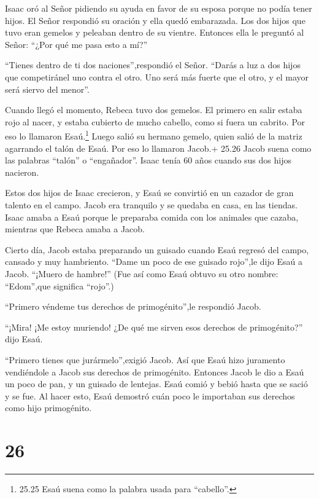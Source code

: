  Isaac oró al Señor pidiendo su ayuda en favor de su esposa
porque no podía tener hijos. El Señor respondió su oración y ella quedó
embarazada.  Los dos hijos que tuvo eran gemelos y peleaban
dentro de su vientre. Entonces ella le preguntó al Señor: ``¿Por qué me
pasa esto a mí?''

 ``Tienes dentro de ti dos naciones'',respondió el Señor.
``Darás a luz a dos hijos que competiránel uno contra el otro. Uno será
más fuerte que el otro, y el mayor será siervo del menor''.

 Cuando llegó el momento, Rebeca tuvo dos gemelos.
 El primero en salir estaba rojo al nacer, y estaba
cubierto de mucho cabello, como si fuera un cabrito. Por eso lo llamaron
Esaú.\footnote{25.25 Esaú suena como la palabra usada para ``cabello''.}
 Luego salió su hermano gemelo, quien salió de la matriz
agarrando el talón de Esaú. Por eso lo llamaron Jacob.+ 25.26 Jacob
suena como las palabras ``talón'' o ``engañador''. Isaac tenía 60 años
cuando sus dos hijos nacieron.

 Estos dos hijos de Isaac crecieron, y Esaú se convirtió en
un cazador de gran talento en el campo. Jacob era tranquilo y se quedaba
en casa, en las tiendas.  Isaac amaba a Esaú porque le
preparaba comida con los animales que cazaba, mientras que Rebeca amaba
a Jacob.

 Cierto día, Jacob estaba preparando un guisado cuando Esaú
regresó del campo, cansado y muy hambriento.  ``Dame un
poco de ese guisado rojo'',le dijo Esaú a Jacob. ``¡Muero de hambre!''
(Fue así como Esaú obtuvo su otro nombre: ``Edom'',que significa
``rojo''.)

 ``Primero véndeme tus derechos de primogénito'',le
respondió Jacob.

 ``¡Mira! ¡Me estoy muriendo! ¿De qué me sirven esos
derechos de primogénito?'' dijo Esaú.

 ``Primero tienes que jurármelo'',exigió Jacob. Así que
Esaú hizo juramento vendiéndole a Jacob sus derechos de primogénito.
 Entonces Jacob le dio a Esaú un poco de pan, y un guisado
de lentejas. Esaú comió y bebió hasta que se sació y se fue. Al hacer
esto, Esaú demostró cuán poco le importaban sus derechos como hijo
primogénito.

\hypertarget{section-25}{%
\section{26}\label{section-25}}

